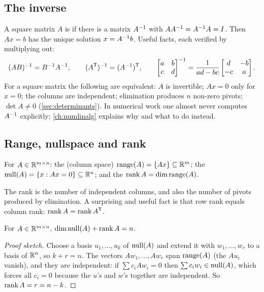 \subsection{The inverse}

A square matrix $A$ is  if there is a matrix $A^{-1}$ with $AA^{-1} = A^{-1} A = I$. Then $Ax = b$ has the
unique solution $x = A^{-1} b$. Useful facts, each verified by multiplying out:
\begin{equation}
  (AB)^{-1} = B^{-1} A^{-1}, \qquad (A^{\mathsf{T}})^{-1} = (A^{-1})^{\mathsf{T}}, \qquad
  \begin{bmatrix} a & b \\ c & d \end{bmatrix}^{-1} = \frac{1}{ad - bc}\begin{bmatrix} d & -b \\ -c & a \end{bmatrix}.
\end{equation}
For a square matrix the following are equivalent: $A$ is invertible; $Ax = 0$ only for $x = 0$; the columns are
independent; elimination produces $n$ non-zero pivots; $\det A \ne 0$ (\cref{sec:determinants}). In numerical work one
almost never computes $A^{-1}$ explicitly; \cref{ch:numlinalg} explains why and what to do instead.

\subsection{Range, nullspace and rank}

\begin{definition}
For $A \in \mathbb{R}^{m\times n}$: the  (column space) $\operatorname{range}(A) = \{Ax\} \subseteq \mathbb{R}^m$; the 
$\operatorname{null}(A) = \{x : Ax = 0\} \subseteq \mathbb{R}^n$; and the  $\operatorname{rank} A = \dim\operatorname{range}(A)$.
\end{definition}

The rank is the number of independent columns, and also the number of pivots produced by elimination. A
surprising and useful fact is that row rank equals column rank: $\operatorname{rank} A = \operatorname{rank} A^{\mathsf{T}}$.

\begin{theorem}
For $A \in \mathbb{R}^{m\times n}$, $\dim\operatorname{null}(A) + \operatorname{rank} A = n$.
\end{theorem}
\begin{proof}[Proof sketch]
Choose a basis $u_1, \dots, u_k$ of $\operatorname{null}(A)$ and extend it with $w_1, \dots, w_r$ to a basis of $\mathbb{R}^n$, so $k + r = n$. The
vectors $Aw_1, \dots, Aw_r$ span $\operatorname{range}(A)$ (the $Au_i$ vanish), and they are independent: if $\sum c_iAw_i = 0$ then
$\sum c_iw_i \in \operatorname{null}(A)$, which forces all $c_i = 0$ because the $u$'s and $w$'s together are independent. So
$\operatorname{rank} A = r = n - k$.
\end{proof}

